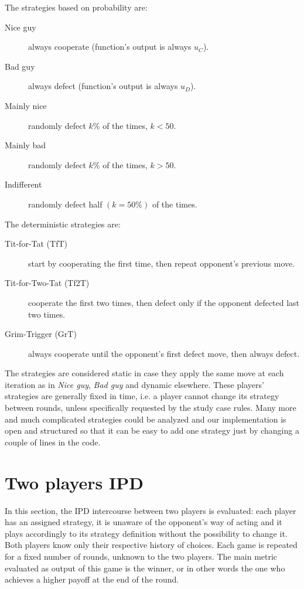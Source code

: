 \documentclass[journal,10pt,twoside]{IEEEtran}
\begin{document}
The strategies based on probability are:
\begin{description}
    \item[Nice guy] always cooperate (function's output is always $u_C$).
    \item[Bad guy] always defect (function's output is always $u_D$).
    \item[Mainly nice] randomly defect $k\%$ of the times, $k<50$.%
    \item[Mainly bad] randomly defect $k\%$ of the times, $k>50$.%
    \item[Indifferent] randomly defect half $(k=50\%)$ of the times.
\end{description}

The deterministic strategies are:
\begin{description}
    \item[Tit-for-Tat (TfT)] start by cooperating the first time, then repeat opponent's previous move.
    \item[Tit-for-Two-Tat (Tf2T)] cooperate the first two times, then defect only if the opponent defected last two times.
    \item[Grim-Trigger (GrT)] always cooperate until the opponent's first defect move, then always defect. 
\end{description}

The strategies are considered static in case they apply the same move at each iteration as in \textit{Nice guy}, \textit{Bad guy} and dynamic elsewhere.
These players' strategies are generally fixed in time, i.e. a player cannot change its strategy between rounds, unless specifically requested by the study case rules.%
Many more and much complicated strategies could be analyzed and our implementation is open and structured so that it can be easy to add one strategy just by changing a couple of lines in the code.

\section{Two players IPD} \label{s:IPD2P}
In this section, the IPD intercourse between two players is evaluated: each player has an assigned strategy, it is unaware of the opponent's way of acting and it plays accordingly to its strategy definition without the possibility to change it. Both players know only their respective history of choices. Each game is repeated for a fixed number of rounds, unknown to the two players. The main metric evaluated as output of this game is the winner, or in other words the one who achieves a higher payoff at the end of the round.
\end{document}
